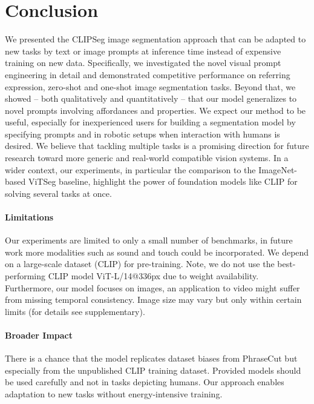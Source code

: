 \section{Conclusion}

We presented the CLIPSeg image segmentation approach that can be adapted to new tasks by text or image prompts at inference time instead of expensive training on new data. 
Specifically, we investigated the novel visual prompt engineering in detail and demonstrated competitive performance on referring expression, zero-shot and one-shot image segmentation tasks.
Beyond that, we showed -- both qualitatively and quantitatively -- that our model generalizes to novel prompts involving affordances and properties.
We expect our method to be useful, especially for inexperienced users for building a segmentation model by specifying prompts and in robotic setups when interaction with humans is desired.
We believe that tackling multiple tasks is a promising direction for future research toward more generic and real-world compatible vision systems.
In a wider context, our experiments, in particular the comparison to the ImageNet-based ViTSeg baseline, highlight the power of foundation models like CLIP for solving several tasks at once.

\paragraph{Limitations}
Our experiments are limited to only a small number of benchmarks, in future work more modalities such as sound and touch could be incorporated. We depend on a large-scale dataset (CLIP) for pre-training. Note, we do not use the best-performing CLIP model ViT-L/14@336px due to weight availability. Furthermore, our model focuses on images, an application to video might suffer from missing temporal consistency. Image size may vary but only within certain limits (for details see supplementary).

\paragraph{Broader Impact}
There is a chance that the model replicates dataset biases from PhraseCut but especially from the unpublished CLIP training dataset. Provided models should be used carefully and not in tasks depicting humans.
Our approach enables adaptation to new tasks without energy-intensive training. 

{
\small
}

\clearpage

